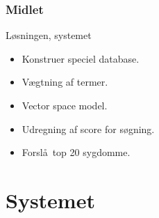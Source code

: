 \documentclass[xcolor=table]{beamer}
\begin{document}
\begin{frame}

  \frametitle{Midlet}

  \begin{block}{L\o sningen, systemet}

    \begin{itemize}

      \item Konstruer speciel database.
      \item V\ae gtning af termer.
      \item Vector space model.
      \item Udregning af score for s\o gning.
      \item Forsl\aa\ top 20 sygdomme.

    \end{itemize}

  \end{block}

\end{frame}

\section{Systemet}

\subsection*{}
\end{document}
